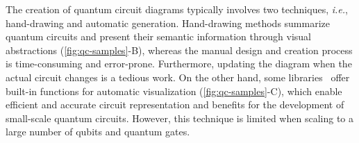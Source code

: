 The creation of quantum circuit diagrams typically involves two techniques, \emph{i.e.}, hand-drawing and automatic generation.
Hand-drawing methods summarize quantum circuits and present their semantic information through visual abstractions (\cref{fig:qc-samples}-B), whereas the manual design and creation process is time-consuming and error-prone.
Furthermore, updating the diagram when the actual circuit changes is a tedious work.
On the other hand, some libraries~\cite{Qiskit, Cirq} offer built-in functions for automatic visualization (\cref{fig:qc-samples}-C), which enable efficient and accurate circuit representation and benefits for the development of small-scale quantum circuits.
However, this technique is limited when scaling to a large number of qubits and quantum gates.

